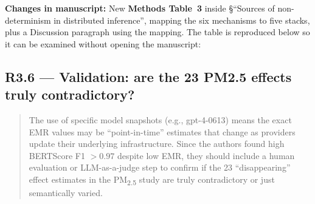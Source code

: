 \documentclass[11pt,a4paper]{article}
\newenvironment{revquote}{%
  \begin{quote}\small\itshape\color{revgray}
}{%
  \end{quote}
}
\newcommand{\changes}[1]{\par\noindent\textbf{\color{revblue}Changes in manuscript:} #1\par}
\begin{document}
\changes{New \textbf{Methods Table~3} inside §``Sources of non-determinism in distributed inference'', mapping the six mechanisms to five stacks, plus a Discussion paragraph using the mapping. The table is reproduced below so it can be examined without opening the manuscript:}

\begin{table}[H]
\centering
\caption*{\small\textbf{Methods Table~3 (manuscript). Mapping of non-determinism mechanisms to deployment stacks.} \checkmark, present and verifiable; ``likely'', consistent with public documentation and standard production practice; ``possible'', plausible but not confirmed; ---, absent or strongly mitigated; $\triangle$, present in principle but mitigated by design (single-GPU integer arithmetic). For closed-source stacks, attribution is necessarily inferential.}
\small
{}
\end{table}

\subsection*{R3.6 --- Validation: are the 23 PM2.5 effects truly contradictory?}

\begin{revquote}
The use of specific model snapshots (e.g., gpt-4-0613) means the exact EMR values may be ``point-in-time'' estimates that change as providers update their underlying infrastructure. Since the authors found high BERTScore F1 $>0.97$ despite low EMR, they should include a human evaluation or LLM-as-a-judge step to confirm if the 23 ``disappearing'' effect estimates in the PM\textsubscript{2.5} study are truly contradictory or just semantically varied.
\end{revquote}
\end{document}
